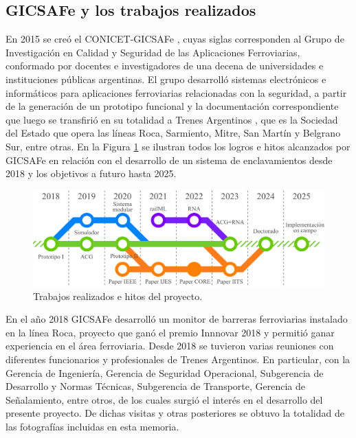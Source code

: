 \subsection{GICSAFe y los trabajos realizados}

    En 2015 se creó el CONICET-GICSAFe \cite{GICSAFE}, cuyas siglas corresponden al Grupo de Investigación en Calidad y Seguridad de las Aplicaciones Ferroviarias, conformado por docentes e investigadores de una decena de universidades e instituciones públicas argentinas. El grupo desarrolló sistemas electrónicos e informáticos para aplicaciones ferroviarias relacionadas con la seguridad, a partir de la generación de un prototipo funcional y la documentación correspondiente que luego se transfirió en su totalidad a Trenes Argentinos \cite{TRENES}, que es la Sociedad del Estado que opera las líneas Roca, Sarmiento, Mitre, San Martín y Belgrano Sur, entre otras. En la Figura \ref{fig:contexto} se ilustran todos los logros e hitos alcanzados por GICSAFe en relación con el desarrollo de un sistema de enclavamientos desde 2018 y los objetivos a futuro hasta 2025.

    \begin{figure}[H]
        \centering
        \includegraphics[width=1\textwidth]{Figuras/hojaDeRuta}
        \centering\caption{Trabajos realizados e hitos del proyecto.}
        \label{fig:contexto}
    \end{figure}

    En el año 2018 GICSAFe desarrolló un monitor de barreras ferroviarias instalado en la línea Roca, proyecto que ganó el premio Innnovar 2018 \cite{INNOVAR_1,INNOVAR_2} y permitió ganar experiencia en el área ferroviaria. Desde 2018 se tuvieron varias reuniones con diferentes funcionarios y profesionales de Trenes Argentinos. En particular, con la Gerencia de Ingeniería, Gerencia de Seguridad Operacional, Subgerencia de Desarrollo y Normas Técnicas, Subgerencia de Transporte, Gerencia de Señalamiento, entre otros, de los cuales surgió el interés en el desarrollo del presente proyecto. De dichas visitas y otras posteriores se obtuvo la totalidad de las fotografías incluidas en esta memoria. 


